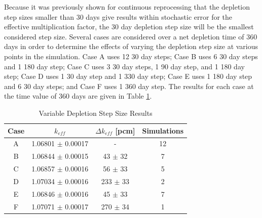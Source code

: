 Because it was previously shown for continuous reprocessing that the depletion step sizes smaller than 30 days give results within stochastic error for the effective multiplication factor, the 30 day depletion step size will be the smallest considered step size. Several cases are considered over a net depletion time of 360 days in order to determine the effects of varying the depletion step size at various points in the simulation. Case A uses 12 30 day steps; Case B uses 6 30 day steps and 1 180 day step; Case C uses 3 30 day steps, 1 90 day step, and 1 180 day step; Case D uses 1 30 day step and 1 330 day step; Case E uses 1 180 day step and 6 30 day steps; and Case F uses 1 360 day step. The results for each case at the time value of 360 days are given in Table \ref{tab:var-dep-step-size}.


\begin{table}[H]
\renewcommand{\arraystretch}{1.25}
\caption{Variable Depletion Step Size Results}
\label{tab:var-dep-step-size}
\begin{center}
\begin{tabular}{ c | c | c | c }
 \hline
 Case & $k_{eff}$ & $\Delta k_{eff}$ [pcm]  & Simulations\\
 \hline
 \hline
 A & 1.06801 $\pm$ 0.00017  & - & 12\\
 B & 1.06844 $\pm$ 0.00015 & 43 $\pm$ 32  & 7\\
 C & 1.06857 $\pm$ 0.00016  & 56 $\pm$ 33  & 5\\
 D & 1.07034 $\pm$ 0.00016 & 233 $\pm$ 33  & 2\\
 E & 1.06846 $\pm$ 0.00016 & 45 $\pm$ 33  & 7\\
 F & 1.07071 $\pm$ 0.00017 & 270 $\pm$ 34 & 1\\
 \hline
\end{tabular}
\end{center}
\end{table}



